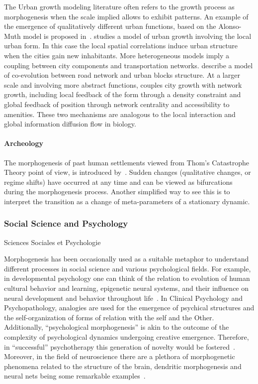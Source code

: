 The Urban growth modeling literature often refers to the growth process as morphogenesis when the scale implied allows to exhibit patterns. An example of the emergence of qualitatively different urban functions, based on the Alonso-Muth model is proposed in~\cite{bonin2012modele}. \cite{makse1998modeling} studies a model of urban growth involving the local urban form. In this case the local spatial correlations induce urban structure when the cities gain new inhabitants. More heterogeneous models imply a coupling between city components and transportation networks. \cite{achibet2014model} describe a model of co-evolution between road network and urban blocks structure. At a larger scale and involving more abstract functions, \cite{raimbault2014hybrid} couples city growth with network growth, including local feedback of the form through a density constraint and global feedback of position through network centrality and accessibility to amenities. These two mechanisms are analogous to the local interaction and global information diffusion flow in biology.


\paragraph{Archeology}

The morphogenesis of past human settlements viewed from Thom's Catastrophe Theory point of view, is introduced by~\cite{renfrew1978trajectory}. Sudden changes (qualitative changes, or regime shifts) have occurred at any time and can be viewed as bifurcations during the morphogenesis process. Another simplified way to see this is to interpret the transition as a change of meta-parameters of a stationary dynamic.






\subsubsection*{Social Science and Psychology}{Sciences Sociales et Psychologie}



Morphogenesis has been occasionally used as a suitable metaphor to understand different processes in social science and various psychological fields. For example, in developmental psychology one can think of the relation to evolution of human cultural behavior and learning, epigenetic neural systems, and their influence on neural development and behavior throughout life~\cite{hart_held_2013}. In Clinical Psychology and Psychopathology, analogies are used for the emergence of psychical structures and the self-organization of forms of relation with the self and the Other. Additionally, “psychological morphogenesis” is akin to the outcome of the complexity of psychological dynamics undergoing creative emergence. Therefore, in “successful” psychotherapy this generation of novelty would be fostered~\cite{piers_self-organizing_2007}. Moreover, in the field of neuroscience there are a plethora of morphogenetic phenomena related to the structure of the brain, dendritic morphogenesis and neural nets being some remarkable examples~\cite{_issues_2013}.

